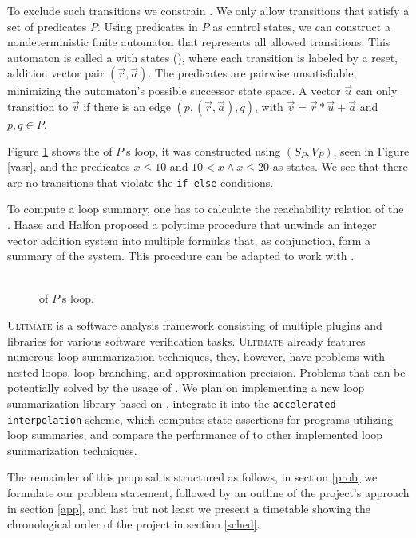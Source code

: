 To exclude such transitions we constrain \qvasr. We only allow transitions that satisfy a set of predicates $P$. Using predicates in $P$ as control states, we can construct a nondeterministic finite automaton that represents all allowed transitions. This automaton is called a \qvasr with states (\qvasrs), where each transition is labeled by a reset, addition vector pair $(\vec{r}, \vec{a})$. The predicates are pairwise unsatisfiable, minimizing the automaton's possible successor state space. A vector $\vec{u}$ can only transition to $\vec{v}$ if there is an edge $(p, (\vec{r}, \vec{a}), q)$, with $\vec{v} = \vec{r} * \vec{u} + \vec{a}$ and $p, q \in P$. \par
Figure \ref{vasrs} shows the \qvasrs of $P$'s loop, it was constructed using $(S_P, V_P)$, seen in Figure \ref{vasr}, and the predicates $x \leq 10$ and $10 < x \land x \leq 20$ as states. We see that there are no transitions that violate the \texttt{if else} conditions. \par
To compute a loop summary, one has to calculate the reachability relation of the \qvasrs. Haase and Halfon \cite{DBLP:conf/rp/HaaseH14} proposed a polytime procedure that unwinds an integer vector addition system into multiple formulas that, as conjunction, form a summary of the system. This procedure can be adapted to work with \qvasrs. \\ \par
\begin{figure}[H]
	
	\caption{\\ \qvasrs of $P$'s loop.}
	\label{vasrs}
\end{figure}
\textsc{Ultimate}\cite{Zitat02} is a software analysis framework consisting of multiple plugins and libraries for various software verification tasks. \textsc{Ultimate} already features numerous loop summarization techniques, they, however, have problems with nested loops, loop branching, and approximation precision. Problems that can be potentially solved by the usage of \qvasrs. We plan on implementing a new loop summarization library based on \qvasrs, integrate it into the \texttt{accelerated interpolation} scheme, which computes state assertions for programs utilizing loop summaries, and compare the performance of \qvasrs to other implemented loop summarization techniques. \par
The remainder of this proposal is structured as follows, in section \ref{prob} we formulate our problem statement, followed by an outline of the project's approach in section \ref{app}, and last but not least we present a timetable showing the chronological order of the project in section \ref{sched}.
